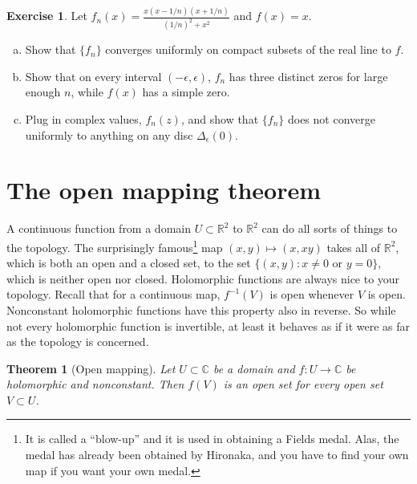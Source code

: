 \documentclass[12pt,openany]{book}
\newcommand{\C}{{\mathbb{C}}}
\newcommand{\R}{{\mathbb{R}}}
\newcommand{\myquote}[1]{``#1''}
\theoremstyle{plain}
\newtheorem{thm}{Theorem}[section]
\theoremstyle{remark}
\theoremstyle{definition}
\newenvironment{exbox}{%
    \def\FrameCommand{\vrule width 1pt \relax\hspace{10pt}}%
    \MakeFramed{\advance\hsize-\width\FrameRestore}%
}{%
    \endMakeFramed
}
\newenvironment{exparts}{%
    \leavevmode\begin{enumerate}[a),noitemsep,topsep=0pt,parsep=0pt,partopsep=0pt]
}{%
    \end{enumerate}
}
\theoremstyle{exercise}
\newtheorem{exercise}{Exercise}[section]
\theoremstyle{example}
\begin{document}
\begin{exbox}
\begin{exercise}
Let $f_n(x) = \frac{x(x-1/n)(x+1/n)}{{(1/n)}^2+x^2}$ and $f(x)=x$.
\begin{exparts}
\item
Show that $\{ f_n \}$ converges uniformly on compact subsets of the real
line to $f$.
\item
Show that on every interval $(-\epsilon,\epsilon)$, $f_n$ has three distinct zeros
for large enough $n$, while $f(x)$ has a simple zero.
\item
Plug in complex values, $f_n(z)$, and show that $\{ f_n \}$ does not
converge uniformly to anything on any disc $\Delta_{\epsilon}(0)$.
\end{exparts}
\end{exercise}
\end{exbox}


\section{The open mapping theorem}

A continuous function from a domain $U \subset \R^2$ to $\R^2$ can do all
sorts of things to the topology.  The surprisingly famous\footnote{%
It is called a \myquote{blow-up} and it is used in obtaining a Fields medal.
Alas, the medal has already been obtained by Hironaka, and you
have to find your own map if you want your own medal.}
map $(x,y) \mapsto (x,xy)$
takes all of $\R^2$, which is both an open and a closed set, to the
set $\bigl\{ (x,y) : x \not= 0 \text{ or } y=0 \bigr\}$, which is neither open nor
closed.
Holomorphic functions are always nice to your topology.
Recall that for a continuous map, $f^{-1}(V)$ is open whenever
$V$ is open.  Nonconstant holomorphic functions have this property also in
reverse.  So while not every holomorphic function is invertible, at least it
behaves as if it were as far as the topology is concerned.


\begin{thm}[Open mapping]\label{thm:OMT}
Let $U \subset \C$ be a domain and $f \colon U \to \C$ be
holomorphic and nonconstant.  Then $f(V)$ is an open set for every open set
$V \subset U$.
\end{thm}
\end{document}
